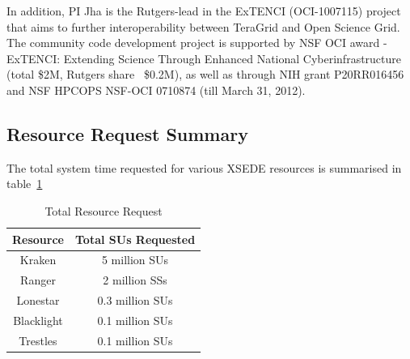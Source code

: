 \documentclass[a4paper,10pt]{article}
\newcommand{\up}{\vspace*{-1em}}
\begin{document}
In addition, PI Jha is the Rutgers-lead in the ExTENCI (OCI-1007115) project that aims to further interoperability between TeraGrid and Open Science Grid.  The community code development project is supported by NSF OCI award - ExTENCI: Extending Science Through Enhanced National Cyberinfrastructure (total \$2M, Rutgers share ~\$0.2M), as well as through NIH grant P20RR016456 and NSF HPCOPS NSF-OCI 0710874 (till March 31, 2012).

\subsection*{Resource Request Summary}

The total system time requested for various XSEDE resources is summarised in table~\ref{table:systems}
\begin{table}[!h]
\up
\begin{center}
\begin{tabular}{|c| c | }
\hline 
Resource & Total SUs Requested \\ 
\hline
Kraken   & 5 million SUs \\
\hline
Ranger   & 2 million SSs \\
\hline
Lonestar & 0.3 million SUs \\
\hline
Blacklight & 0.1 million SUs \\
\hline
Trestles & 0.1 million SUs \\
\hline
\end{tabular}
\end{center}
  \caption{Total Resource Request}\label{table:systems}
\up
\end{table}



\end{document}
